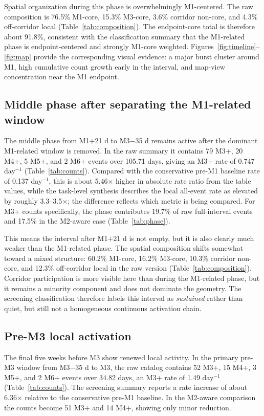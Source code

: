 \documentclass[11pt]{article}
\begin{document}
Spatial organization during this phase is overwhelmingly M1-centered. The raw composition is 76.5\% M1-core, 15.3\% M3-core, 3.6\% corridor non-core, and 4.3\% off-corridor local (Table~\ref{tab:composition}). The endpoint-core total is therefore about 91.8\%, consistent with the classification summary that the M1-related phase is endpoint-centered and strongly M1-core weighted. Figures~\ref{fig:timeline}--\ref{fig:map} provide the corresponding visual evidence: a major burst cluster around M1, high cumulative count growth early in the interval, and map-view concentration near the M1 endpoint.

\subsection{Middle phase after separating the M1-related window}
The middle phase from M1$+$21 d to M3$-$35 d remains active after the dominant M1-related window is removed. In the raw summary it contains 79 M3+, 20 M4+, 5 M5+, and 2 M6+ events over 105.71 days, giving an M3+ rate of 0.747 day$^{-1}$ (Table~\ref{tab:counts}). Compared with the conservative pre-M1 baseline rate of 0.137 day$^{-1}$, this is about 5.46$\times$ higher in absolute rate ratio from the table values, while the task-level synthesis describes the local all-event rate as elevated by roughly 3.3--3.5$\times$; the difference reflects which metric is being compared. For M3+ counts specifically, the phase contributes 19.7\% of raw full-interval events and 17.5\% in the M2-aware case (Table~\ref{tab:phase}).

This means the interval after M1$+$21 d is not empty, but it is also clearly much weaker than the M1-related phase. The spatial composition shifts somewhat toward a mixed structure: 60.2\% M1-core, 16.2\% M3-core, 10.3\% corridor non-core, and 12.3\% off-corridor local in the raw version (Table~\ref{tab:composition}). Corridor participation is more visible here than during the M1-related phase, but it remains a minority component and does not dominate the geometry. The screening classification therefore labels this interval as \emph{sustained} rather than quiet, but still not a homogeneous continuous activation chain.

\subsection{Pre-M3 local activation}
The final five weeks before M3 show renewed local activity. In the primary pre-M3 window from M3$-$35 d to M3, the raw catalog contains 52 M3+, 15 M4+, 3 M5+, and 2 M6+ events over 34.82 days, an M3+ rate of 1.49 day$^{-1}$ (Table~\ref{tab:counts}). The screening summary reports a rate increase of about 6.36$\times$ relative to the conservative pre-M1 baseline. In the M2-aware comparison the counts become 51 M3+ and 14 M4+, showing only minor reduction.
\end{document}
